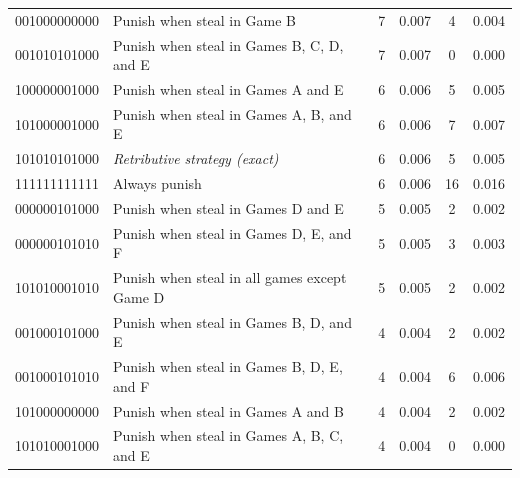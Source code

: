 \documentclass[
  man, donotrepeattitle,floatsintext]{apa6}
\begin{document}
\begin{table}[H]
\begin{center}
\begin{threeparttable}
{\begin{tabular}{llcccc}
001000000000 & Punish when steal in Game B & 7 & 0.007 & 4 & 0.004\\
001010101000 & Punish when steal in Games B, C, D, and E & 7 & 0.007 & 0 & 0.000\\
100000001000 & Punish when steal in Games A and E & 6 & 0.006 & 5 & 0.005\\
101000001000 & Punish when steal in Games A, B, and E & 6 & 0.006 & 7 & 0.007\\
101010101000 & \textit{Retributive strategy (exact)} & 6 & 0.006 & 5 & 0.005\\
111111111111 & Always punish & 6 & 0.006 & 16 & 0.016\\
000000101000 & Punish when steal in Games D and E & 5 & 0.005 & 2 & 0.002\\
000000101010 & Punish when steal in Games D, E, and F & 5 & 0.005 & 3 & 0.003\\
101010001010 & Punish when steal in all games except Game D & 5 & 0.005 & 2 & 0.002\\
001000101000 & Punish when steal in Games B, D, and E & 4 & 0.004 & 2 & 0.002\\
001000101010 & Punish when steal in Games B, D, E, and F & 4 & 0.004 & 6 & 0.006\\
101000000000 & Punish when steal in Games A and B & 4 & 0.004 & 2 & 0.002\\
101010001000 & Punish when steal in Games A, B, C, and E & 4 & 0.004 & 0 & 0.000\\
\bottomrule
\end{tabular}

}

\end{threeparttable}
\end{center}

\end{table}

\newpage
\end{document}
